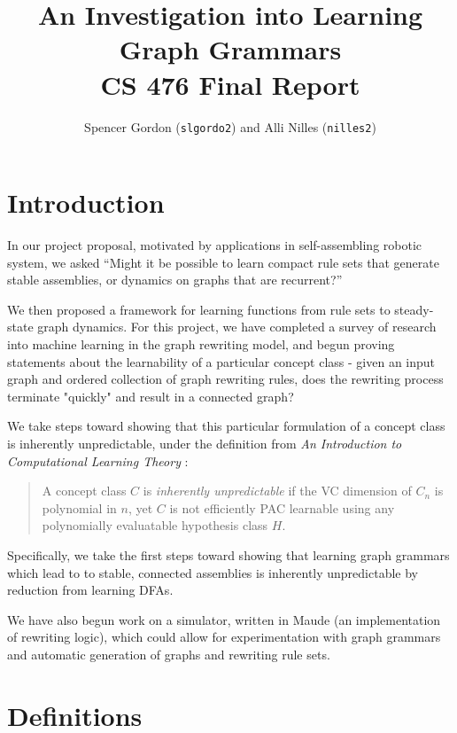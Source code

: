 \documentclass[]{article}
\title{%
An Investigation into Learning Graph Grammars \\
\Large CS 476 Final Report}
\author{Spencer Gordon (\texttt{slgordo2}) and Alli Nilles (\texttt{nilles2})}
\date{}
\begin{document}
\maketitle

\newcommand{\step}[1]{\xrightarrow{#1}}
\newcommand{\steps}[1]{\xRightarrow{#1}}

\section{Introduction}

In our project proposal, motivated by applications in self-assembling
robotic system, we asked ``Might it be possible to learn compact rule
sets that generate stable assemblies, or dynamics on graphs that are
recurrent?''

We then proposed a framework for learning functions from rule sets to
steady-state graph dynamics. For this project, we have completed a survey of
research into machine learning in the graph rewriting model, and begun
proving statements about the learnability of a particular concept class - given
an input graph and ordered collection of graph rewriting rules, does the
rewriting process terminate "quickly" and result in a connected graph?

We take steps toward showing that this particular formulation of a concept class
is inherently unpredictable, under the definition from \emph{An Introduction to
 Computational Learning Theory} \cite{kearns1994}:

\begin{quote}
A concept class \(C\) is \emph{inherently unpredictable} if the VC
dimension of \(C_n\) is polynomial in \(n\), yet \(C\) is not
efficiently PAC learnable using any polynomially evaluatable hypothesis
class \(H\).
\end{quote}

Specifically, we take the first steps toward showing that learning graph
grammars which lead to to stable, connected assemblies is inherently
unpredictable by reduction from learning DFAs.

We have also begun work on a simulator, written in Maude (an implementation of
rewriting logic), which could allow for experimentation with graph grammars and
automatic generation of graphs and rewriting rule sets.

\section{Definitions}\label{definitions}
\end{document}
